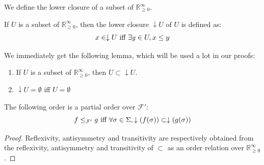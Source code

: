 \documentclass[a4paper,10pt]{llncs}
\def\RRposi {{\mathbb R_{\geq 0}^{\infty}}}
\begin{document}
We define the lower closure of a subset of $\RRposi$.
\begin{definition}
If $U$ is a subset of $\RRposi$, then the lower closure $\downarrow U$ of $U$ is defined as:
$$x \in \downarrow U \textnormal{ iff } \exists y \in U, x \leq y$$
\end{definition}
We immediately get the following lemma, which will be used a lot in our proofs:
\begin{lemma}
\label{magical_lemma}

\begin{enumerate}
\item If $U$ is a subset of $\RRposi$, then $U \subset \downarrow U$.
\item $\downarrow U = \emptyset$ iff $U = \emptyset$ 
\end{enumerate}
\end{lemma}

\begin{theorem} The following order is a partial order over $\mathcal{F}'$:
$$f \leq_{\mathcal{F}'} g \textnormal{ iff } \forall \sigma \in \Sigma, \downarrow(f(\sigma)) \subset \downarrow(g(\sigma))$$
\end{theorem}
\begin{proof} Reflexivity, antisymmetry and transitivity are respectively obtained from the reflexivity, antisymmetry and transitivity of $\subset$ as an order relation over $\RRposi$.
\end{proof}
\end{document}

